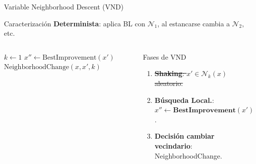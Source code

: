 \documentclass[aspectratio=169, 11pt, xcolor={dvipsnames,table}]{beamer}
\newcommand{\naranja}[1]{\textcolor{UsachNaranja}{#1}}
\begin{document}
\begin{frame}{Variable Neighborhood Descent (VND)}
\begin{block}{Caracterización}
\textbf{Determinista}: aplica BL con $\mathcal{N}_1$, al estancarse cambia a $\mathcal{N}_2$, etc.
\end{block}
\vspace{-4pt}

\begin{columns}[T]

\scriptsize
\begin{algorithm}[H]
\caption{VND$(x, k'_{\max})$}
\begin{algorithmic}[1]
\Repeat
  \State $k \gets 1$
  \Repeat
    \State$x'' \gets \text{BestImprovement}(x')$
    \State $\text{NeighborhoodChange}(x, x', k)$
\end{algorithmic}
\end{algorithm}

\center
\begin{alertblock}{Fases de VND}
\begin{enumerate}
  \item \st{\textbf{Shaking}: $x' \in \mathcal{N}_k(x)$ aleatorio.}
  \item \textbf{Búsqueda Local.}: \naranja{$x'' \gets \textbf{BestImprovement}(x')$}.
  \item \textbf{Decisión cambiar vecindario}: NeighborhoodChange.
\end{enumerate}
\end{alertblock}
\end{columns}

\end{frame}








\end{document}
